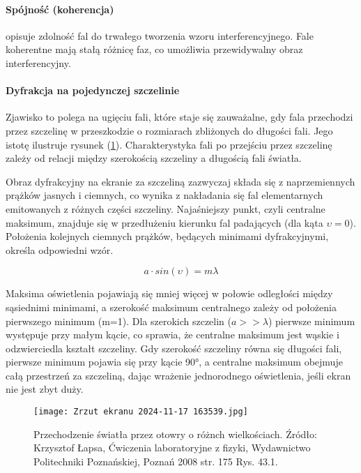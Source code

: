 \documentclass{article}
\begin{document}
\paragraph{Spójność (koherencja)}opisuje zdolność fal do trwałego tworzenia wzoru interferencyjnego. Fale koherentne mają stałą różnicę faz, co umożliwia przewidywalny obraz interferencyjny.

\paragraph{Dyfrakcja na pojedynczej szczelinie} Zjawisko to polega na ugięciu fali, które staje się zauważalne, gdy fala przechodzi przez szczelinę w przeszkodzie o rozmiarach zbliżonych do długości fali. Jego istotę ilustruje rysunek (\ref{fig:rys1}). Charakterystyka fali po przejściu przez szczelinę zależy od relacji między szerokością szczeliny a długością fali światła.

Obraz dyfrakcyjny na ekranie za szczeliną zazwyczaj składa się z naprzemiennych prążków jasnych i ciemnych, co wynika z nakładania się fal elementarnych emitowanych z różnych części szczeliny. Najaśniejszy punkt, czyli centralne maksimum, znajduje się w przedłużeniu kierunku fal padających (dla kąta $\upsilon=0$). Położenia kolejnych ciemnych prążków, będących minimami dyfrakcyjnymi, określa odpowiedni wzór.

\begin{equation}
    a \cdot sin(\upsilon) = m \lambda
\end{equation}

Maksima oświetlenia pojawiają się mniej więcej w połowie odległości między sąsiednimi minimami, a szerokość maksimum centralnego zależy od położenia pierwszego minimum (m=1). Dla szerokich szczelin ($a>>\lambda$) pierwsze minimum występuje przy małym kącie, co sprawia, że centralne maksimum jest wąskie i odzwierciedla kształt szczeliny. Gdy szerokość szczeliny równa się długości fali, pierwsze minimum pojawia się przy kącie 90°, a centralne maksimum obejmuje całą przestrzeń za szczeliną, dając wrażenie jednorodnego oświetlenia, jeśli ekran nie jest zbyt duży.

\begin{figure}
    \centering
    \texttt{[image: Zrzut ekranu 2024-11-17 163539.jpg]}
    \caption{Przechodzenie światła przez otowry o różnch wielkościach. Źródło:  Krzysztof Łapsa, Ćwiczenia laboratoryjne z fizyki, Wydawnictwo Politechniki Poznańskiej, Poznań 2008 str. 175  Rys. 43.1.}
    \label{fig:rys1}
\end{figure}
\end{document}
